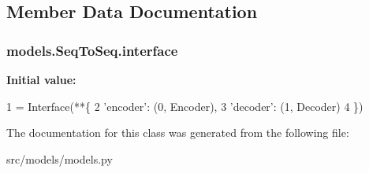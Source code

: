 \subsection{Member Data Documentation}
\subsubsection[{\texorpdfstring{interface}{interface}}]{\setlength{\rightskip}{0pt plus 5cm}models.\+Seq\+To\+Seq.\+interface\hspace{0.3cm}{\ttfamily [static]}}\hypertarget{classmodels_1_1SeqToSeq_a32da252c54cb7a4e7a1dd4366f5bc33d}{}\label{classmodels_1_1SeqToSeq_a32da252c54cb7a4e7a1dd4366f5bc33d}
{\bfseries Initial value\+:}
\begin{DoxyCode}
1 = Interface(**\{
2         \textcolor{stringliteral}{'encoder'}:    (0, Encoder),
3         \textcolor{stringliteral}{'decoder'}:    (1, Decoder)
4     \})
\end{DoxyCode}


The documentation for this class was generated from the following file\+:\begin{DoxyCompactItemize}
\item 
src/models/models.\+py\end{DoxyCompactItemize}
